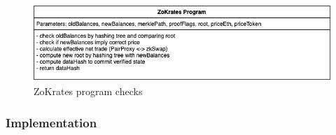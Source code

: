 \documentclass[../../thesis.tex]{subfiles}
\begin{document}
\begin{figure}[h]
    \centerline{\includegraphics[totalheight=3cm]{diagrams/zokrates.png}}
    \caption{ZoKrates program checks}
    \label{fig:zokrates}
\end{figure}

\subsubsection{Implementation}








\end{document}
